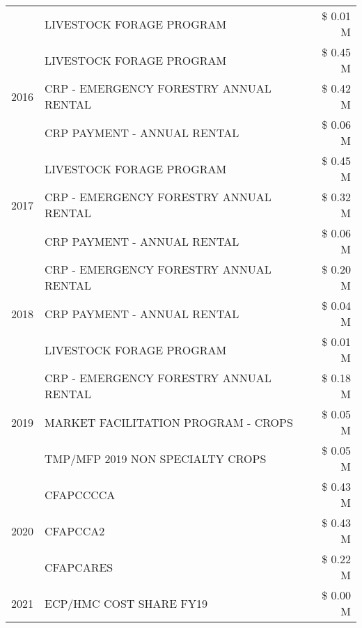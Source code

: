 \begin{tabular}{llr}
 & LIVESTOCK FORAGE PROGRAM & \$ 0.01 M \\
\cline{1-3}
\multirow[t]{3}{*}{2016} & LIVESTOCK FORAGE PROGRAM & \$ 0.45 M \\
 & CRP - EMERGENCY FORESTRY ANNUAL RENTAL & \$ 0.42 M \\
 & CRP PAYMENT - ANNUAL RENTAL & \$ 0.06 M \\
\cline{1-3}
\multirow[t]{3}{*}{2017} & LIVESTOCK FORAGE PROGRAM & \$ 0.45 M \\
 & CRP - EMERGENCY FORESTRY ANNUAL RENTAL & \$ 0.32 M \\
 & CRP PAYMENT - ANNUAL RENTAL & \$ 0.06 M \\
\cline{1-3}
\multirow[t]{3}{*}{2018} & CRP - EMERGENCY FORESTRY ANNUAL RENTAL & \$ 0.20 M \\
 & CRP PAYMENT - ANNUAL RENTAL & \$ 0.04 M \\
 & LIVESTOCK FORAGE PROGRAM & \$ 0.01 M \\
\cline{1-3}
\multirow[t]{3}{*}{2019} & CRP - EMERGENCY FORESTRY ANNUAL RENTAL & \$ 0.18 M \\
 & MARKET FACILITATION PROGRAM - CROPS & \$ 0.05 M \\
 & TMP/MFP 2019 NON SPECIALTY CROPS & \$ 0.05 M \\
\cline{1-3}
\multirow[t]{3}{*}{2020} & CFAPCCCCA & \$ 0.43 M \\
 & CFAPCCA2 & \$ 0.43 M \\
 & CFAPCARES & \$ 0.22 M \\
\cline{1-3}
2021 & ECP/HMC COST SHARE FY19 & \$ 0.00 M \\
\cline{1-3}
\bottomrule
\end{tabular}
